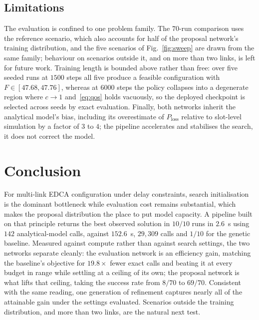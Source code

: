 \documentclass[journal,a4paper,comsoc,twocolumn]{IEEEtran}
\newcommand{\Ploss}[1][]{P_{\mathrm{loss}#1}}
\begin{document}
\subsection{Limitations}
\label{sec:limits}

The evaluation is confined to one problem family. The $70$-run comparison uses
the reference scenario, which also accounts for half of the proposal network's
training distribution, and the five scenarios of Fig.~\ref{fig:sweep} are drawn
from the same family; behaviour on scenarios outside it, and on more than two
links, is left for future work. Training length is bounded above rather than
free: over five seeded runs at $1500$ steps all five produce a feasible
configuration with $F \in [47.68, 47.76]$, whereas at $6000$ steps the policy
collapses into a degenerate region where $c \to 1$ and~\eqref{eq:qos} holds
vacuously, so the deployed checkpoint is selected across seeds by exact
evaluation. Finally, both networks inherit the analytical model's bias,
including its overestimate of $\Ploss$ relative to slot-level simulation by a
factor of $3$ to $4$; the pipeline accelerates and stabilises the search, it
does not correct the model.

\section{Conclusion}
\label{sec:conclusion}

For multi-link EDCA configuration under delay constraints, search
initialisation is the dominant bottleneck while evaluation cost remains
substantial, which makes the proposal distribution the place to put model
capacity. A pipeline built on that principle returns the best observed
solution in $10/10$ runs in $2.6$~s using $142$ analytical-model calls, against
$152.6$~s, $29{,}309$ calls and $1/10$ for the genetic baseline. Measured
against compute rather than against search settings, the two networks separate
cleanly: the evaluation
network is an efficiency gain, matching the baseline's objective for
$19.8\times$ fewer exact calls and beating it at every budget in range while
settling at a ceiling of its own; the proposal network is what lifts that
ceiling, taking the success rate from $8/70$ to $69/70$. Consistent with the
same reading, one generation of refinement captures nearly all of the attainable
gain under the settings evaluated. Scenarios outside the training distribution,
and more than two links, are the natural next test.



\end{document}
